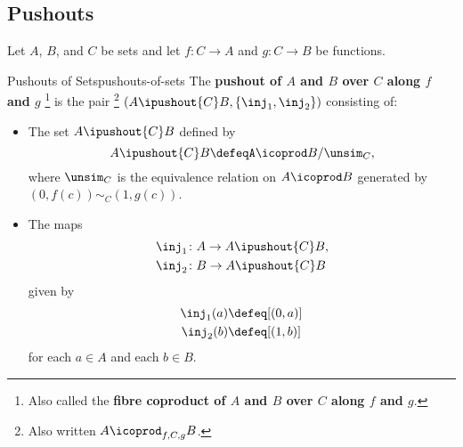 \subsection{Pushouts}\label{subsection-pushouts}
Let $A$, $B$, and $C$ be sets and let $f\colon C\to A$ and $g\colon C\to B$ be functions.
\begin{definition}{Pushouts of Sets}{pushouts-of-sets}%
    The \textbf{pushout of $A$ and $B$ over $C$ along $f$ and $g$}%
    \footnote{%
        Also called the \textbf{fibre coproduct of $A$ and $B$ over $C$ along $f$ and $g$}.
    } %
    is the pair%
    \footnote{%
        Also written $A\icoprod_{f,C,g}B$.
        \par\vspace*{-1.75\baselineskip}
    } %
    $(A\ipushout{C}B,\{\inj_{1},\inj_{2}\})$ consisting of:
    \begin{itemize}
        \item{}The set $A\ipushout{C}B$ defined by
            \[
                A\ipushout{C}B%
                \defeq%
                A\icoprod B/\unsim_{C},
            \]%
            where $\unsim_{C}$ is the equivalence relation on $A\icoprod B$ generated by $(0,f(c))\sim_{C}(1,g(c))$.
        \item{}The maps
            \begin{align*}
                \inj_{1} &\colon A\to A\ipushout{C}B,\\
                \inj_{2} &\colon B\to A\ipushout{C}B
            \end{align*}
            given by
            \begin{align*}
                \inj_{1}(a) &\defeq [(0,a)]\\%
                \inj_{2}(b) &\defeq [(1,b)]%
            \end{align*}
            for each $a\in A$ and each $b\in B$.
    \end{itemize}
\end{definition}
